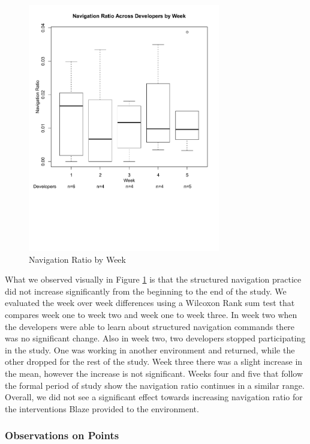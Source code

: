 \documentclass{sig-alternate}
\begin{document}
\begin{figure}
	\includegraphics[width=3.3in]{navratioboxplot_ann.pdf}
	\caption{Navigation Ratio by Week}
	\label{fig:navigationaverage}
\end{figure}

What we observed visually in Figure \ref{fig:navigationaverage} is that the structured navigation practice did not increase significantly from the beginning to the end of the study.  We evaluated the week over week differences using a Wilcoxon Rank sum test \cite{RefWorks:118} that compares week one to week two and week one to week three.    In week two when the developers were able to learn about structured navigation commands there was no significant change.  Also in week two, two developers stopped participating in the study.  One was working in another environment and returned, while the other dropped for the rest of the study.  Week three there was a slight increase in the mean, however the increase is not significant.  Weeks four and five that follow the formal period of study show the navigation ratio continues in a similar range.  Overall, we did not see a significant effect towards increasing navigation ratio for the interventions Blaze provided to the environment.    

\subsubsection{Observations on Points}
\end{document}
